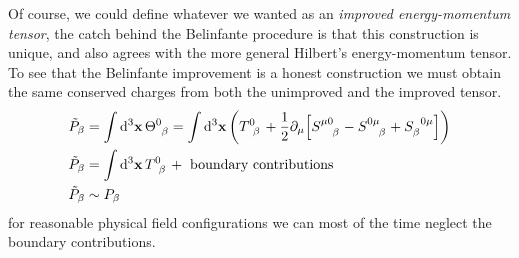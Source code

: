 Of course, we could define whatever we wanted as an \textit{improved energy-momentum tensor}, the catch behind the 
Belinfante procedure is that this construction is unique, and also agrees with the more general Hilbert's energy-momentum tensor. 
To see that the Belinfante improvement is a honest construction we must obtain the same conserved charges from both the unimproved and 
the improved tensor.
\begin{align}
    {\tilde P}_\beta &= \int\dd[3]{\vb x}\tensor{\Theta}{^0_\beta} = \int\dd[3]{\vb x}\qty(\tensor{T}{^0_\beta} + \frac12\partial_\mu \qty[\tensor{S}{^\mu^0_\beta}-\tensor{S}{^0^\mu_\beta}+\tensor{S}{_\beta^0^\mu}])\\
    {\tilde P}_\beta &=\int\dd[3]{\vb x}\tensor{T}{^0_\beta} + \textnormal{ boundary contributions}\\
    {\tilde P}_\beta &\sim P_\beta
\end{align}
for reasonable physical field configurations we can most of the time neglect the boundary contributions.

